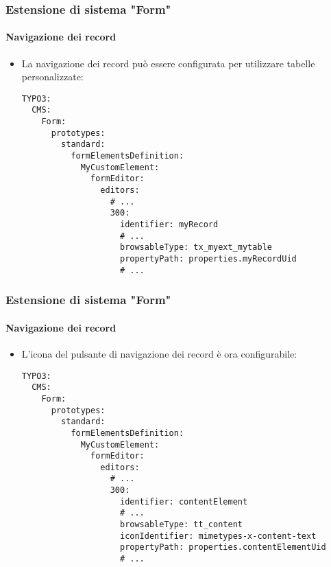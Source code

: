 
\begin{frame}[fragile]
	\frametitle{Estensione di sistema "Form"}
	\framesubtitle{Navigazione dei record}

	\lstset{basicstyle=\tiny\ttfamily}

	\begin{itemize}
		\item La navigazione dei record può essere configurata per utilizzare tabelle personalizzate:
\begin{lstlisting}
TYPO3:
  CMS:
    Form:
      prototypes:
        standard:
          formElementsDefinition:
            MyCustomElement:
              formEditor:
                editors:
                  # ...
                  300:
                    identifier: myRecord
                    # ...
                    browsableType: tx_myext_mytable
                    propertyPath: properties.myRecordUid
                    # ...
\end{lstlisting}

	\end{itemize}

\end{frame}


\begin{frame}[fragile]
	\frametitle{Estensione di sistema "Form"}
	\framesubtitle{Navigazione dei record}

	\lstset{basicstyle=\tiny\ttfamily}

	\begin{itemize}
		\item L'icona del pulsante di navigazione dei record è ora configurabile:
\begin{lstlisting}
TYPO3:
  CMS:
    Form:
      prototypes:
        standard:
          formElementsDefinition:
            MyCustomElement:
              formEditor:
                editors:
                  # ...
                  300:
                    identifier: contentElement
                    # ...
                    browsableType: tt_content
                    iconIdentifier: mimetypes-x-content-text
                    propertyPath: properties.contentElementUid
                    # ...
\end{lstlisting}

	\end{itemize}

\end{frame}

